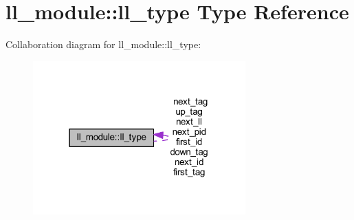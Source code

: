 \hypertarget{structll__module_1_1ll__type}{}\section{ll\+\_\+module\+:\+:ll\+\_\+type Type Reference}
\label{structll__module_1_1ll__type}


Collaboration diagram for ll\+\_\+module\+:\+:ll\+\_\+type\+:\nopagebreak
\begin{figure}[H]
\begin{center}
\leavevmode
\includegraphics[width=232pt]{structll__module_1_1ll__type__coll__graph}
\end{center}
\end{figure}
